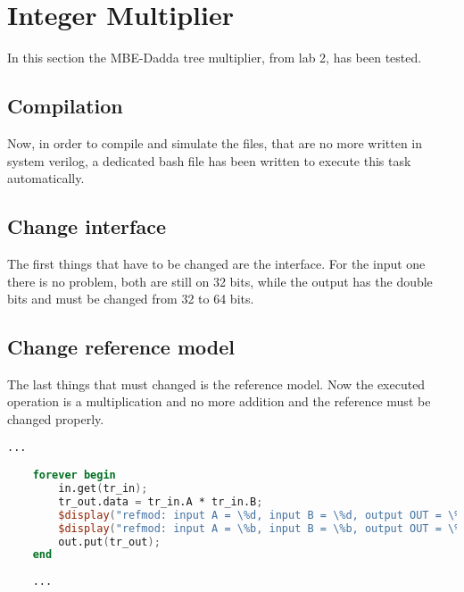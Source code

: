 %
\chapter{Integer Multiplier}
\label{cha3}

In this section the MBE-Dadda tree multiplier, from lab 2, has been tested.

\section{Compilation}
Now, in order to compile and simulate the files, that are no more written in system verilog, a dedicated 
bash file has been written to execute this task automatically.



\section{Change interface}

The first things that have to be changed are the interface. For the input one there is no problem,
both are still on 32 bits, while the output has the double bits and must be changed from 32 to 64 bits.



\section{Change reference model}

The last things that must changed is the reference model. Now the executed operation is a multiplication and 
no more addition and the reference must be changed properly.

\begin{lstlisting}[language=Verilog, caption=Inside refmode.sv]
    ... 

    forever begin
        in.get(tr_in);
        tr_out.data = tr_in.A * tr_in.B;
        $display("refmod: input A = \%d, input B = \%d, output OUT = \%d",tr_in.A, tr_in.B, tr_out.data);
        $display("refmod: input A = \%b, input B = \%b, output OUT = \%b",tr_in.A, tr_in.B, tr_out.data);
        out.put(tr_out);
    end
    
    ...
\end{lstlisting}

